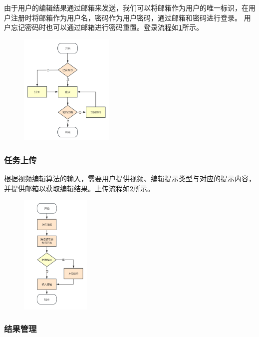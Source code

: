 由于用户的编辑结果通过邮箱来发送，我们可以将邮箱作为用户的唯一标识，在用户注册时将邮箱作为用户名，密码作为用户密码，通过邮箱和密码进行登录。
用户忘记密码时也可以通过邮箱进行密码重置。登录流程如\ref{fig:login_process}所示。
\begin{figure}[ht]
    \centering
    \includegraphics[width=0.4\textwidth]{source/img/login_process.png}
    \label{fig:login_process}
\end{figure}

\subsubsection{任务上传}

根据视频编辑算法的输入，需要用户提供视频、编辑提示类型与对应的提示内容，并提供邮箱以获取编辑结果。上传流程如\ref{fig:upload_process}所示。
\begin{figure}[ht]
    \centering
    \includegraphics[width=0.3\textwidth]{source/img/edit_process.png}
    \label{fig:upload_process}
\end{figure}

\subsubsection{结果管理}

